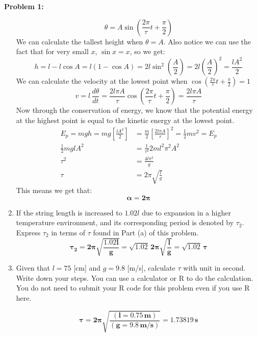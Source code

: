 \documentclass[11pt]{article}
\newenvironment{problem}[1]{\textbf{Problem #1: }}{\newpage}
\begin{document}
\begin{problem}{1}
\begin{enumerate}[label = (\alph*)]
			\[\theta = A\sin\left(\frac{2\pi}{\tau} t + \frac{\pi}{2}\right)\]
			We can calculate the tallest height when $\theta = A$.  Also notice we can use the fact that for very small $x$, $\sin x = x$, so we get:
			\[h = l - l\cos A = l(1 - \cos A) = 2l\sin^2\left(\frac{A}{2}\right) = 2l\left(\frac{A}{2}\right)^2 = \frac{lA^2}{2}\]
			We can calculate the velocity at the lowest point when $\cos\left(\frac{2\pi}{\tau} t + \frac{\pi}{2}\right) = 1$
			\[v = l\,\frac{d\theta}{dt} = \frac{2l\pi A}{\tau}\cos\left(\frac{2\pi}{\tau} t + \frac{\pi}{2}\right) = \frac{2l\pi A}{\tau}\]
			Now through the conservation of energy, we know that the potential energy at the highest point is equal to the kinetic energy at the lowest point.
			\begin{align*}
				E_p = mgh = mg\left[\frac{lA^2}{2}\right] &= \frac{m}{2}\left[\frac{2l\pi A}{\tau}\right]^2 = \frac{1}{2}mv^2 = E_p \\
				\frac{1}{2} mglA^2 &= \frac{1}{\tau^2}2ml^2\pi^2A^2 \\
				\tau^2 &= \frac{4l\pi^2}{g} \\
				\tau &= 2\pi \sqrt{\frac{l}{g}}
			\end{align*}
			This means we get that:
			\[\boldsymbol{\alpha = 2\pi}\]
			\item  If the string length is increased to $1.02l$ due to expansion in a higher temperature environment, and
			its corresponding period is denoted by $\tau_2$. Express $\tau_2$ in terms of $\tau$ found in Part (a) of this problem.
			\[\boldsymbol{\tau_2 = 2\pi \sqrt{\frac{1.02l}{g}} = \sqrt{1.02}\,2\pi \sqrt{\frac{l}{g}} = \sqrt{1.02}\,\tau} \]
			\item Given that $l = 75$ [cm] and $g = 9.8$ [m/s], calculate $\tau$ with unit in second. Write down your steps.
			You can use a calculator or R to do the calculation. You do not need to submit your R code for this
			problem even if you use R here.

			\[\boldsymbol{\tau = 2\pi \sqrt{\frac{(l = 0.75\,m)}{(g = 9.8\,m / s)}} = 1.73819\,s}\]
		\end{enumerate}
	\end{problem}
\end{document}
